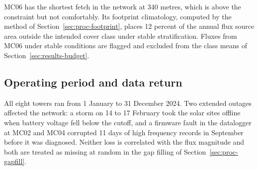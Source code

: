 MC06 has the shortest fetch in the network at 340 metres, which is above the
constraint but not comfortably. Its footprint climatology, computed by the
method of Section~\ref{sec:proc-footprint}, places 12 percent of the annual flux
source area outside the intended cover class under stable stratification. Fluxes
from MC06 under stable conditions are flagged and excluded from the class means
of Section~\ref{sec:results-budget}.

\subsection{Operating period and data return}
\label{sec:network-return}

All eight towers ran from 1 January to 31 December 2024. Two extended outages
affected the network: a storm on 14 to 17 February took the solar sites offline
when battery voltage fell below the cutoff, and a firmware fault in the
datalogger at MC02 and MC04 corrupted 11 days of high frequency records in
September before it was diagnosed. Neither loss is correlated with the flux
magnitude and both are treated as missing at random in the gap filling of
Section~\ref{sec:proc-gapfill}.
